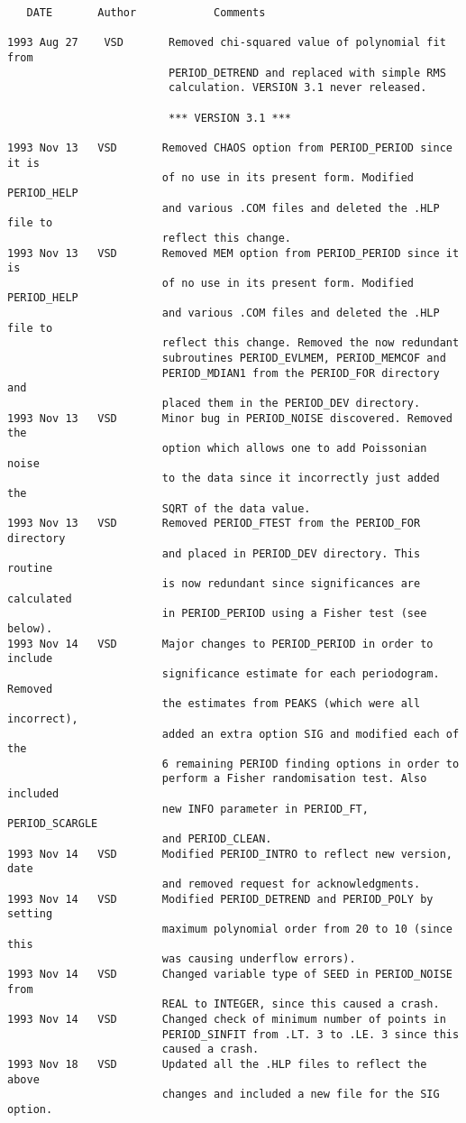 \begin{verbatim}
   DATE       Author            Comments                           
                           
1993 Aug 27    VSD       Removed chi-squared value of polynomial fit from
                         PERIOD_DETREND and replaced with simple RMS 
                         calculation. VERSION 3.1 never released.
	                   
                         *** VERSION 3.1 *** 
	                   
1993 Nov 13   VSD       Removed CHAOS option from PERIOD_PERIOD since it is
                        of no use in its present form. Modified PERIOD_HELP
                        and various .COM files and deleted the .HLP file to
                        reflect this change.
1993 Nov 13   VSD       Removed MEM option from PERIOD_PERIOD since it is
                        of no use in its present form. Modified PERIOD_HELP
                        and various .COM files and deleted the .HLP file to
                        reflect this change. Removed the now redundant 
                        subroutines PERIOD_EVLMEM, PERIOD_MEMCOF and 
                        PERIOD_MDIAN1 from the PERIOD_FOR directory and 
                        placed them in the PERIOD_DEV directory.
1993 Nov 13   VSD       Minor bug in PERIOD_NOISE discovered. Removed the 
                        option which allows one to add Poissonian noise 
                        to the data since it incorrectly just added the 
                        SQRT of the data value.
1993 Nov 13   VSD       Removed PERIOD_FTEST from the PERIOD_FOR directory
                        and placed in PERIOD_DEV directory. This routine
                        is now redundant since significances are calculated
                        in PERIOD_PERIOD using a Fisher test (see below).
1993 Nov 14   VSD       Major changes to PERIOD_PERIOD in order to include
                        significance estimate for each periodogram. Removed 
                        the estimates from PEAKS (which were all incorrect),
                        added an extra option SIG and modified each of the 
                        6 remaining PERIOD finding options in order to 
                        perform a Fisher randomisation test. Also included
                        new INFO parameter in PERIOD_FT, PERIOD_SCARGLE 
                        and PERIOD_CLEAN.
1993 Nov 14   VSD       Modified PERIOD_INTRO to reflect new version, date
                        and removed request for acknowledgments.
1993 Nov 14   VSD       Modified PERIOD_DETREND and PERIOD_POLY by setting
                        maximum polynomial order from 20 to 10 (since this
                        was causing underflow errors).
1993 Nov 14   VSD       Changed variable type of SEED in PERIOD_NOISE from
                        REAL to INTEGER, since this caused a crash.
1993 Nov 14   VSD       Changed check of minimum number of points in
                        PERIOD_SINFIT from .LT. 3 to .LE. 3 since this 
                        caused a crash.
1993 Nov 18   VSD       Updated all the .HLP files to reflect the above
                        changes and included a new file for the SIG option.
                           

\end{verbatim}
